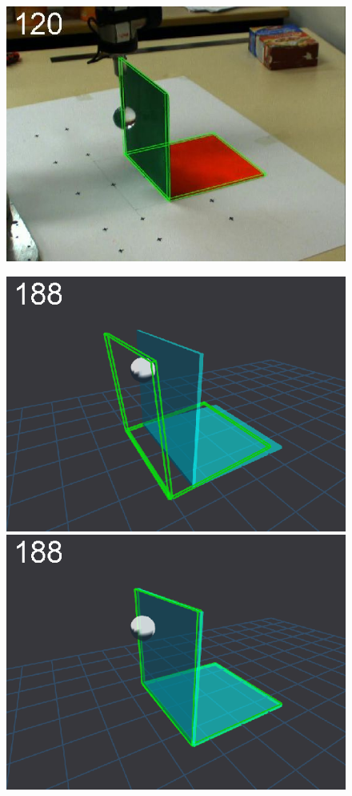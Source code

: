 \begin{figure}[tb]
{\includegraphics[width=\imgBXwid]{images/B2_2exp_38_1}
}
\centerline{
\includegraphics[width=\imgBXwid]{images/B1_1exp_20_2}
\includegraphics[width=\imgBXwid]{images/B1_2exp_20_2}
}
\end{figure}
